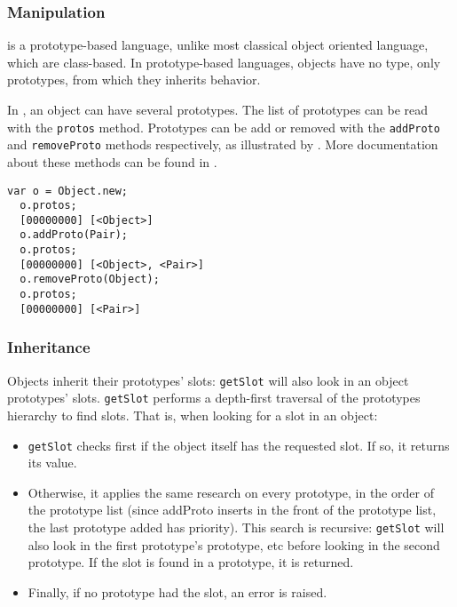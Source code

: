 \documentclass[openright,twoside,12pt]{report}
\begin{document}
\subsubsection{Manipulation}

\us is a prototype-based language, unlike most classical object
oriented language, which are class-based. In prototype-based
languages, objects have no type, only prototypes, from which they
inherits behavior.

In \us, an object can have several prototypes. The list of prototypes
can be read with the \lstinline|protos| method. Prototypes can be add
or removed with the \lstinline|addProto| and \lstinline|removeProto|
methods respectively, as illustrated by . More
documentation about these methods can be found in .

\begin{lstlisting}[caption=Manipulating prototypes, label=lst:prototypes,
  float=\floatpos]
  var o = Object.new;
  o.protos;
  [00000000] [<Object>]
  o.addProto(Pair);
  o.protos;
  [00000000] [<Object>, <Pair>]
  o.removeProto(Object);
  o.protos;
  [00000000] [<Pair>]
\end{lstlisting}

\subsubsection{Inheritance}

Objects inherit their prototypes' slots: \lstinline|getSlot| will also
look in an object prototypes' slots. \lstinline|getSlot| performs a
depth-first traversal of the prototypes hierarchy to find slots. That
is, when looking for a slot in an object:

\begin{itemize}
\item \lstinline|getSlot| checks first if the object itself has the
  requested slot. If so, it returns its value.
\item Otherwise, it applies the same research on every prototype, in
  the order of the prototype list (since addProto inserts in the front
  of the prototype list, the last prototype added has priority). This
  search is recursive: \lstinline|getSlot| will also look in the first
  prototype's prototype, etc before looking in the second
  prototype. If the slot is found in a prototype, it is returned.
\item Finally, if no prototype had the slot, an error is raised.
\end{itemize}
\end{document}

